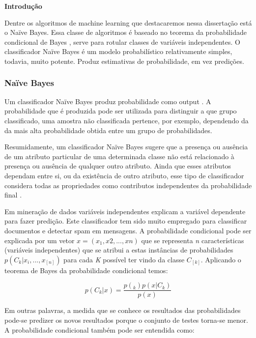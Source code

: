 \textbf{Introdução}


Dentre os algoritmos de machine learning que destacaremos nessa dissertação está o Naïve Bayes. 
Essa classe de algoritmos é baseado no teorema da probabilidade condicional de Bayes \cite{montgomery2000estatistica}, serve 
para rotular classes de variáveis independentes. O classificador Naïve Bayes é um modelo probabilístico relativamente simples, todavia, muito potente. Produz estimativas de probabilidade, em vez predições.

\subsubsection{Naïve Bayes}
\vspace{5mm}

Um classificador Naïve Bayes produz probabilidade como output \cite{policarpo2015semantic}. A probabilidade que é produzida pode ser utilizada para distinguir a que grupo classificado, uma amostra não classificada pertence, por exemplo, dependendo da da mais alta probabilidade obtida entre um grupo de probabilidades.

Resumidamente, um classificador Naïve Bayes sugere que a presença ou ausência de um atributo particular de uma determinada classe não está relacionado à presença ou ausência de qualquer outro atributo. Ainda que esses atributos dependam entre si, ou da existência de outro atributo, esse tipo de classificador considera todas as propriedades como contributos independentes da probabilidade final \cite{policarpo2015semantic}.

Em mineração de dados variáveis independentes explicam a variável dependente para fazer predição.
Este classificador tem sido muito empregado para classificar documentos e detectar spam em mensagens. 
A probabilidade condicional pode ser explicada por um vetor $x = (x_{1}, x{2}, ..., x{n})$ que se representa \textit{n} características (variáveis independentes) que se atribui a estas instâncias de probabilidades $p(C_{k}|x_{i},...,x_[n])$ para cada \textit{K} possível ter vindo da classe $C_[k]$. Aplicando o teorema de Bayes da probabilidade condicional temos:

\begin{equation}
p(C_{k}|x) = \frac{p(_{k})p(x|C_{k})}{p(x)}
\end{equation}

Em outras palavras, a medida que se conhece os resultados das probabilidades pode-se predizer os novos resultados porque o conjunto de testes torna-se menor. A probabilidade condicional também pode ser entendida como:

